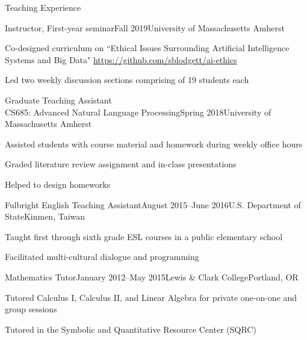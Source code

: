 \documentclass{resume} %
\begin{document}

\begin{rSection}{Teaching Experience}

\begin{rSubsection}{Instructor, First-year seminar}{Fall 2019}{University of Massachusetts Amherst}{}
\item Co-designed curriculum on ``Ethical Issues Surrounding Artificial Intelligence Systems and Big Data" \url{https://github.com/sblodgett/ai-ethics}
\item Led two weekly discussion sections comprising of 19 students each 
\end{rSubsection}

\begin{rSubsection}{Graduate Teaching Assistant \\ CS685: Advanced Natural Language Processing}{Spring 2018}{University of Massachusetts Amherst}{}
\item Assisted students with course material and homework during weekly office hours
\item Graded literature review assignment and in-class presentations 
\item Helped to design homeworks
\end{rSubsection}

\begin{rSubsection}{Fulbright English Teaching Assistant}{August 2015--June 2016}{U.S. Department of State}{Kinmen, Taiwan}
\item Taught first through sixth grade ESL courses in a public elementary school
\item Facilitated multi-cultural dialogue and programming
\end{rSubsection}

\begin{rSubsection}{Mathematics Tutor}{January 2012--May 2015}{Lewis \& Clark College}{Portland, OR}
\item Tutored Calculus I, Calculus II, and Linear Algebra for private one-on-one and group sessions
\item Tutored in the Symbolic and Quantitative Resource Center (SQRC) 
\end{rSubsection}

\end{rSection}
\end{document}
